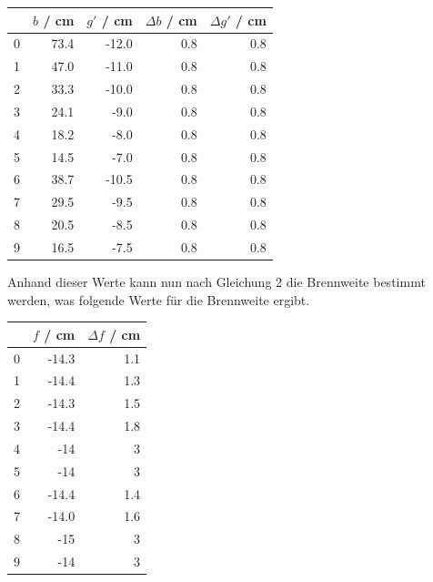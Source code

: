 \documentclass[11pt,ngerman]{scrartcl}
\begin{document}
\begin{center}
	\begin{tabular}{lrrrr}
		\toprule
		{} & $b$ / cm & $g'$ / cm & $\Delta b$ / cm & $\Delta g'$ / cm \\
		\midrule
		0  & 73.4     & -12.0     & 0.8             & 0.8              \\
		1  & 47.0     & -11.0     & 0.8             & 0.8              \\
		2  & 33.3     & -10.0     & 0.8             & 0.8              \\
		3  & 24.1     & -9.0      & 0.8             & 0.8              \\
		4  & 18.2     & -8.0      & 0.8             & 0.8              \\
		5  & 14.5     & -7.0      & 0.8             & 0.8              \\
		6  & 38.7     & -10.5     & 0.8             & 0.8              \\
		7  & 29.5     & -9.5      & 0.8             & 0.8              \\
		8  & 20.5     & -8.5      & 0.8             & 0.8              \\
		9  & 16.5     & -7.5      & 0.8             & 0.8              \\
		\bottomrule
	\end{tabular}
\end{center}

Anhand dieser Werte kann nun nach Gleichung 2 die Brennweite bestimmt werden, was folgende Werte für die Brennweite ergibt.

\begin{center}
	\begin{tabular}{lrr}
		\toprule
		{} & $f$ / cm & $\Delta f$ / cm \\
		\midrule
		0  & -14.3    & 1.1             \\
		1  & -14.4    & 1.3             \\
		2  & -14.3    & 1.5             \\
		3  & -14.4    & 1.8             \\
		4  & -14      & 3               \\
		5  & -14      & 3               \\
		6  & -14.4    & 1.4             \\
		7  & -14.0    & 1.6             \\
		8  & -15      & 3               \\
		9  & -14      & 3               \\
		\bottomrule
	\end{tabular}
\end{center}
\end{document}
